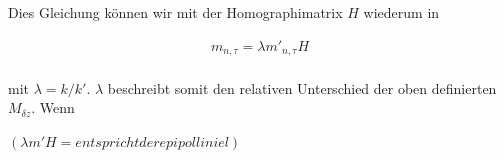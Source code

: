 Dies Gleichung können wir mit der Homographimatrix $H$ wiederum in 

\begin{gather}
	m_{n,\tau} =\lambda  m'_{n,\tau}H
\end{gather}\\

mit $\lambda=k/k'$. $\lambda$ beschreibt somit den relativen Unterschied der oben definierten $M_{\delta z}$. Wenn  

$(\lambda m'H  =entspricht der epipollinie l)$



